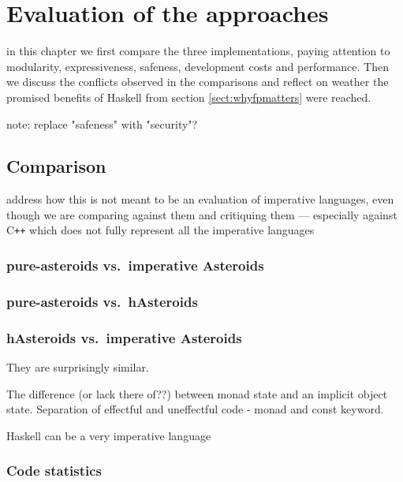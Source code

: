 \documentclass[
  digital, %
  color,   %
  table,   %
  oneside, %
  lof,     %
  lot,     %
]{fithesis3}
\newcommand{\cpp}{C\nolinebreak\texttt{+}\nolinebreak\texttt{+}}
\newcommand{\vs}{vs.\ }
\begin{document}
{%

\chapter{Evaluation of the approaches}
\label{chptr:evaluation}

in this chapter we first compare the three implementations, paying attention to modularity,
expressiveness, safeness, development costs and performance.
Then we discuss the conflicts observed in the comparisons
and reflect on weather the promised benefits of Haskell from section \ref{sect:whyfpmatters}
were reached.

note: replace "safeness" with "security"?

\section{Comparison}

address how this is not meant to be an evaluation of imperative languages,
even though we are comparing against them and critiquing them
--- especially against \cpp{} which does not fully represent all the imperative languages

\subsection{pure-asteroids \vs imperative Asteroids}

\subsection{pure-asteroids \vs hAsteroids}

\subsection{hAsteroids \vs imperative Asteroids}
They are surprisingly similar.

The difference (or lack there of??) between monad state and an implicit object state.
Separation of effectful and uneffectful code - monad and const keyword.

Haskell can be a very imperative language

\subsection{Code statistics}


}
\end{document}
